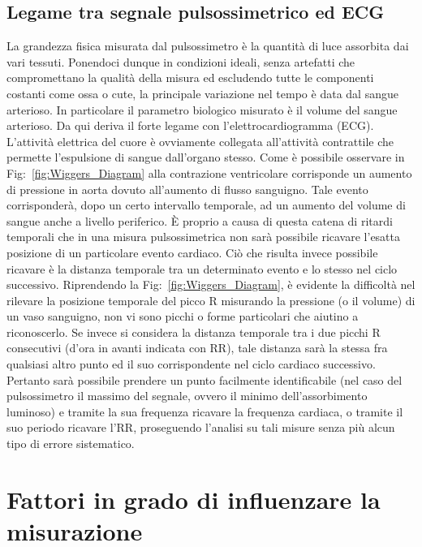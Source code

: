 \documentclass[a4paper, 12pt]{book}
\begin{document}
\subsection{Legame tra segnale pulsossimetrico ed ECG}

La grandezza fisica misurata dal pulsossimetro è la quantità di luce assorbita dai vari tessuti.
Ponendoci dunque in condizioni ideali, senza artefatti che compromettano la qualità della misura ed escludendo tutte le componenti costanti come ossa o cute, la principale variazione nel tempo è data dal sangue arterioso.
In particolare il parametro biologico misurato è il volume del sangue arterioso.
Da qui deriva il forte legame con l'elettrocardiogramma (ECG).
L'attività elettrica del cuore è ovviamente collegata all'attività contrattile che permette l'espulsione di sangue dall'organo stesso.
Come è possibile osservare in Fig:~\ref{fig:Wiggers_Diagram} alla contrazione ventricolare corrisponde un aumento di pressione in aorta dovuto all'aumento di flusso sanguigno.
Tale evento corrisponderà, dopo un certo intervallo temporale, ad un aumento del volume di sangue anche a livello periferico.
È proprio a causa di questa catena di ritardi temporali che in una misura pulsossimetrica non sarà possibile ricavare l'esatta posizione di un particolare evento cardiaco.
Ciò che risulta invece possibile ricavare è la distanza temporale tra un determinato evento e lo stesso nel ciclo successivo.
Riprendendo la Fig:~\ref{fig:Wiggers_Diagram}, è evidente la difficoltà nel rilevare la posizione temporale del picco R misurando la pressione (o il volume) di un vaso sanguigno, non vi sono picchi o forme particolari che aiutino a riconoscerlo.
Se invece si considera la distanza temporale tra i due picchi R consecutivi (d'ora in avanti indicata con RR), tale distanza sarà la stessa fra qualsiasi altro punto ed il suo corrispondente nel ciclo cardiaco successivo.
Pertanto sarà possibile prendere un punto facilmente identificabile (nel caso del pulsossimetro il massimo del segnale, ovvero il minimo dell'assorbimento luminoso) e tramite la sua frequenza ricavare la frequenza cardiaca, o tramite il suo periodo ricavare l'RR, proseguendo l'analisi su tali misure senza più alcun tipo di errore sistematico.



\section{Fattori in grado di influenzare la misurazione}
\end{document}
